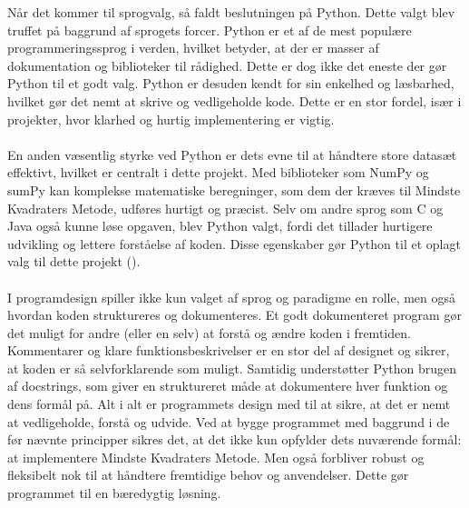 Når det kommer til sprogvalg, så faldt beslutningen på Python. Dette valgt blev truffet på baggrund af sprogets forcer. Python er et af de mest populære programmeringssprog i verden, hvilket betyder, at der er masser af dokumentation og biblioteker til rådighed. Dette er dog ikke det eneste der gør Python til et godt valg. Python er desuden kendt for sin enkelhed og læsbarhed, hvilket gør det nemt at skrive og vedligeholde kode. Dette er en stor fordel, især i projekter, hvor klarhed og hurtig implementering er vigtig. \\\\
En anden væsentlig styrke ved Python er dets evne til at håndtere store datasæt effektivt, hvilket er centralt i dette projekt. Med biblioteker som NumPy og sumPy kan komplekse matematiske beregninger, som dem der kræves til Mindste Kvadraters Metode, udføres hurtigt og præcist. Selv om andre sprog som C og Java også kunne løse opgaven, blev Python valgt, fordi det tillader hurtigere udvikling og lettere forståelse af koden. Disse egenskaber gør Python til et oplagt valg til dette projekt (\cite{simplilearn}). \\\\
I programdesign spiller ikke kun valget af sprog og paradigme en rolle, men også hvordan koden struktureres og dokumenteres. Et godt dokumenteret program gør det muligt for andre (eller en selv) at forstå og ændre koden i fremtiden. Kommentarer og klare funktionsbeskrivelser er en stor del af designet og sikrer, at koden er så selvforklarende som muligt. Samtidig understøtter Python brugen af docstrings, som giver en struktureret måde at dokumentere hver funktion og dens formål på.
Alt i alt er programmets design med til at sikre, at det er nemt at vedligeholde, forstå og udvide. Ved at bygge programmet med baggrund i de før nævnte principper sikres det, at det ikke kun opfylder dets nuværende formål: at implementere Mindste Kvadraters Metode. Men også forbliver robust og fleksibelt nok til at håndtere fremtidige behov og anvendelser. Dette gør programmet til en bæredygtig løsning.

